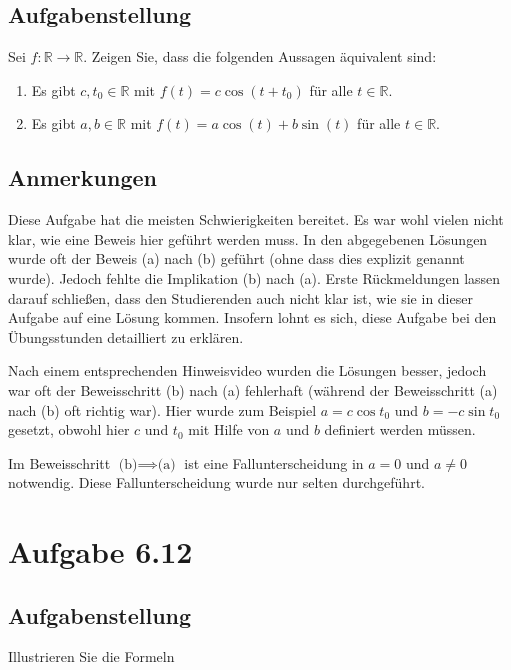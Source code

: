 \documentclass[a4paper]{article}
\newcommand*{\R}{\mathbb R}
\begin{document}
\subsection{Aufgabenstellung}

Sei $f:\R\to\R$. Zeigen Sie, dass die folgenden Aussagen äquivalent sind:

\begin{enumerate}
  \item Es gibt $c,t_0\in\R$ mit $f(t)=c\cos(t+t_0)$ für alle $t\in\R$.
  \item Es gibt $a,b\in\R$ mit $f(t)=a\cos(t)+b\sin(t)$ für alle $t\in\R$.
\end{enumerate}

\subsection{Anmerkungen}

Diese Aufgabe hat die meisten Schwierigkeiten bereitet. Es war wohl vielen nicht klar, wie eine Beweis hier geführt werden muss. In den abgegebenen Lösungen wurde oft der Beweis (a) nach (b) geführt (ohne dass dies explizit genannt wurde). Jedoch fehlte die Implikation (b) nach (a). Erste Rückmeldungen lassen darauf schließen, dass den Studierenden auch nicht klar ist, wie sie in dieser Aufgabe auf eine Lösung kommen. Insofern lohnt es sich, diese Aufgabe bei den Übungsstunden detailliert zu erklären.

Nach einem entsprechenden Hinweisvideo wurden die Lösungen besser, jedoch war oft der Beweisschritt (b) nach (a) fehlerhaft (während der Beweisschritt (a) nach (b) oft richtig war). Hier wurde zum Beispiel $a=c \cos t_0$ und $b=-c\sin t_0$ gesetzt, obwohl hier $c$ und $t_0$ mit Hilfe von $a$ und $b$ definiert werden müssen.

Im Beweisschritt $\text{(b)} \implies \text{(a)}$ ist eine Fallunterscheidung in $a=0$ und $a\neq 0$ notwendig. Diese Fallunterscheidung wurde nur selten durchgeführt.

\section{Aufgabe 6.12}

\subsection{Aufgabenstellung}

Illustrieren Sie die Formeln
\end{document}
